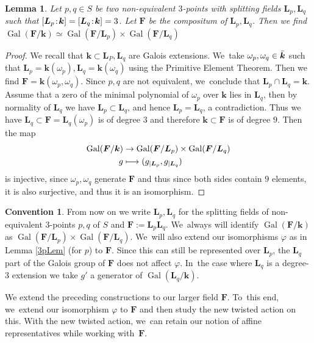 \documentclass[JEP,XML,SOM,Unicode,NoFloatCountersInSection, NoEqCountersInSection,published]{cedram}
\newcommand\mto{\mathchoice{\longmapsto}{\mapsto}{\mapsto}{\mapsto}}
\newcommand{\sep}{\mkern2mu{:}\mkern2mu}
\DeclareMathOperator{\Gal}{Gal}
\newtheorem{lemma}[theorem]{Lemma}
\theoremstyle{definition}
\newtheorem{convention}[theorem]{Convention}
\newcommand{\kk}{{\boldsymbol{k}}}
\newcommand{\FF}{{\boldsymbol{F}}}
\newcommand{\LL}{{\boldsymbol{L}}}
\begin{document}
\begin{lemma}
Let $p,q \in S$ be two non-equivalent $3$\nobreakdash-points with splitting fields $\LL_p, \LL_q$ such that $ [\LL_p\sep \kk] = [\LL_q\sep \kk]=3$. Let $\FF$ be the compositum of $\LL_p, \LL_q$. Then we find $\Gal(\FF/\kk) \simeq \Gal(\FF/\LL_p) \times \Gal(\FF/\LL_q)$
\end{lemma}

\begin{proof}
We recall that $\kk \subset \LL_P, \LL_q$ are Galois extensions. We~take $\omega_p, \omega_q \in \Bar{\kk}$ such that $\LL_p = \kk(\omega_p), \LL_q = \kk(\omega_q)$ using the Primitive Element Theorem. Then we find $\FF = \kk(\omega_p,\omega_q)$. Since $p,q$ are not equivalent, we~conclude that $\LL_p \cap \LL_q = \kk$. Assume that a zero of the minimal polynomial of $\omega_p$ over $\kk$ lies in $\LL_q$, then by normality of $\LL_q$ we have $\LL_p \subset \LL_q$, and hence $\LL_p = \LL_q$, a contradiction. Thus we have $\LL_q \subset \FF = \LL_q(\omega_p)$ is of degree $3$ and therefore $\kk \subset \FF$ is of degree $9$. Then the map
\begin{align*}
\Gal(\FF/\kk) &\to \Gal(\FF/\LL_p) \times \Gal(\FF/\LL_q)
\\
g &\mto (g_{|\LL_p}, g_{|\LL_q})
\end{align*}
is injective, since $\omega_p, \omega_q$ generate $\FF$ and thus since both sides contain $9$ elements, it is also surjective, and thus it is an isomorphism.
\end{proof}

\begin{convention} \label{con:2SF}
From now on we write $\LL_p, \LL_q$ for the splitting fields of non-equivalent $3$\nobreakdash-points $p,q$ of $S$ and $\FF := \LL_p\LL_q$. We~always will identify $\Gal(\FF/\kk) $ as $\Gal(\FF/\LL_p) \times \Gal(\FF/\LL_q)$. We~will also extend our isomorphisms $\varphi$ as in Lemma \ref{3pLem} (for $p$) to $\FF$. Since this can still be represented over $\LL_p$, the $\LL_q$ part of the Galois group of $\FF$ does not affect $\varphi$. In~the case where $\LL_q$ is a degree-$3$ extension we take $g'$ a generator of $\Gal(\LL_q/\kk)$.
\end{convention}
We extend the preceding constructions to our larger field $\FF$. To~this end, we~extend our isomorphism $\varphi$ to $\FF$ and then study the new twisted action on this. With the new twisted action, we~can retain our notion of affine representatives while working with~$\FF$.
\end{document}
